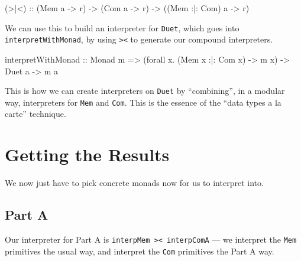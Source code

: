 \documentclass[]{article}
\newenvironment{Shaded}{}{}
\newcommand{\DataTypeTok}[1]{\textcolor[rgb]{0.56,0.13,0.00}{#1}}
\newcommand{\FunctionTok}[1]{\textcolor[rgb]{0.02,0.16,0.49}{#1}}
\newcommand{\NormalTok}[1]{#1}
\newcommand{\OtherTok}[1]{\textcolor[rgb]{0.00,0.44,0.13}{#1}}
\begin{document}
\begin{Shaded}
\begin{Highlighting}[]
\OtherTok{(>|<) ::}\NormalTok{ (}\DataTypeTok{Mem}\NormalTok{ a           }\OtherTok{->}\NormalTok{ r)}
      \OtherTok{->}\NormalTok{ (}\DataTypeTok{Com}\NormalTok{ a           }\OtherTok{->}\NormalTok{ r)}
      \OtherTok{->}\NormalTok{ ((}\DataTypeTok{Mem} \FunctionTok{:|:} \DataTypeTok{Com}\NormalTok{) a }\OtherTok{->}\NormalTok{ r)}
\end{Highlighting}
\end{Shaded}

We can use this to build an interpreter for \texttt{Duet}, which goes into
\texttt{interpretWithMonad}, by using
\texttt{\textgreater{}\textbar{}\textless{}} to generate our compound
interpreters.

\begin{Shaded}
\begin{Highlighting}[]
\NormalTok{interpretWithMonad}
\OtherTok{    ::} \DataTypeTok{Monad}\NormalTok{ m}
    \OtherTok{=>}\NormalTok{ (forall x}\FunctionTok{.}\NormalTok{ (}\DataTypeTok{Mem}\NormalTok{ x }\FunctionTok{:|:} \DataTypeTok{Com}\NormalTok{ x) }\OtherTok{->}\NormalTok{ m x)}
    \OtherTok{->} \DataTypeTok{Duet}\NormalTok{ a}
    \OtherTok{->}\NormalTok{ m a}
\end{Highlighting}
\end{Shaded}

This is how we can create interpreters on \texttt{Duet} by ``combining'', in a
modular way, interpreters for \texttt{Mem} and \texttt{Com}. This is the essence
of the ``data types a la carte'' technique.

\hypertarget{getting-the-results}{%
\section{Getting the Results}\label{getting-the-results}}

We now just have to pick concrete monads now for us to interpret into.

\hypertarget{part-a}{%
\subsection{Part A}\label{part-a}}

Our interpreter for Part A is
\texttt{interpMem\ \textgreater{}\textbar{}\textless{}\ interpComA} --- we
interpret the \texttt{Mem} primitives the usual way, and interpret the
\texttt{Com} primitives the Part A way.
\end{document}
